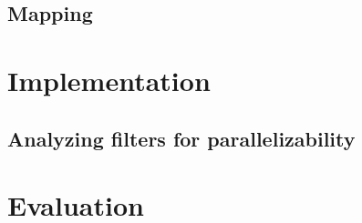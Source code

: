 \subsection{Mapping}

\section{Implementation}

\subsection{Analyzing filters for parallelizability}


\section{Evaluation}
